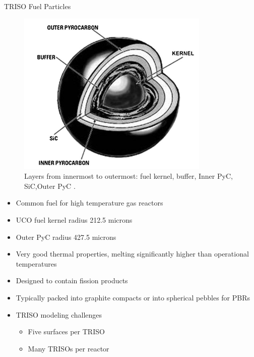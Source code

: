\documentclass[9pt,t,aspectratio=169]{beamer}
\begin{document}
\begin{frame}{TRISO Fuel Particles}
    \begin{minipage}[t]{0.45\linewidth}
        \begin{figure}
            \centering
            \includegraphics[width=0.9\linewidth]{figures/TRISO_diagram_Zhou_Tang.png}
            \caption{Layers from innermost to outermost: fuel kernel, buffer, Inner PyC, SiC,Outer PyC \cite{zhou_tang}.}
        \end{figure}
    \end{minipage}
    \hfill%
    \begin{minipage}[t]{0.45\linewidth}
        \begin{itemize}
            \item Common fuel for high temperature gas reactors
            \item UCO fuel kernel radius 212.5 microns
            \item Outer PyC radius 427.5 microns
            \item Very good thermal properties, melting significantly higher than operational temperatures \cite{zhou_tang}
            \item Designed to contain fission products \cite{zhou_tang}
            \item Typically packed into graphite compacts or into spherical pebbles for PBRs
            \item TRISO modeling challenges
            \begin{itemize}
                \item Five surfaces per TRISO
                \item Many TRISOs per reactor
            \end{itemize}
        \end{itemize}
    \end{minipage}
\end{frame}
\end{document}
